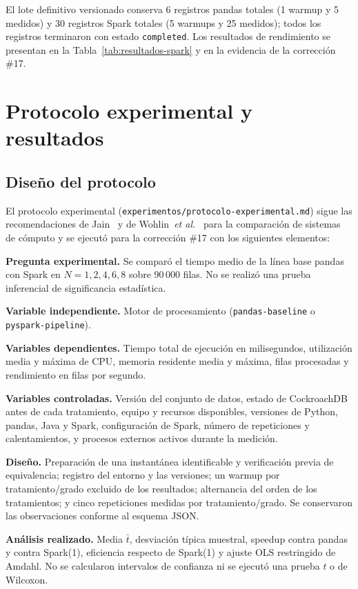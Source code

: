 \documentclass[10pt,twocolumn]{article}
\begin{document}
El lote definitivo versionado conserva 6 registros pandas totales (1 warmup y
5 medidos) y 30 registros Spark totales (5 warmups y 25 medidos); todos los
registros terminaron con estado \texttt{completed}. Los resultados de
rendimiento se presentan en la Tabla~\ref{tab:resultados-spark} y en la
evidencia de la corrección \#17.

\section{Protocolo experimental y resultados}
\label{sec:protocolo}

\subsection{Diseño del protocolo}

El protocolo experimental (\texttt{experimentos/protocolo-experimental.md})
sigue las recomendaciones de Jain~\cite{jain1991performance} y de
Wohlin~\emph{et al.}~\cite{wohlin2012experimentation} para la comparación de sistemas de
cómputo y se ejecutó para la corrección \#17 con los siguientes elementos:

\textbf{Pregunta experimental.} Se comparó el tiempo medio de la línea base
pandas con Spark en $N=1,2,4,6,8$ sobre 90\,000 filas. No se realizó una
prueba inferencial de significancia estadística.

\textbf{Variable independiente.} Motor de procesamiento
(\texttt{pandas-baseline} o \texttt{pyspark-pipeline}).

\textbf{Variables dependientes.} Tiempo total de ejecución en milisegundos,
utilización media y máxima de CPU, memoria residente media y máxima, filas
procesadas y rendimiento en filas por segundo.

\textbf{Variables controladas.} Versión del conjunto de datos, estado de
CockroachDB antes de cada tratamiento, equipo y recursos disponibles,
versiones de Python, pandas, Java y Spark, configuración de Spark, número
de repeticiones y calentamientos, y procesos externos activos durante la
medición.

\textbf{Diseño.} Preparación de una instantánea identificable y verificación
previa de equivalencia; registro del entorno y las versiones; un warmup por
tratamiento/grado excluido de los resultados; alternancia del orden de los
tratamientos; y cinco repeticiones medidas por tratamiento/grado. Se
conservaron las observaciones conforme al esquema JSON.

\textbf{Análisis realizado.} Media $\bar t$, desviación típica muestral,
speedup contra pandas y contra Spark(1), eficiencia respecto de Spark(1) y
ajuste OLS restringido de Amdahl. No se calcularon intervalos de confianza ni
se ejecutó una prueba $t$ o de Wilcoxon.
\end{document}

